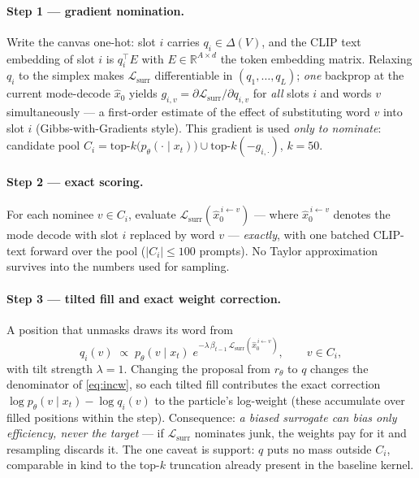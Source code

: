 \documentclass[11pt]{article}
\newcommand{\Ploss}{\mathcal{L}}
\newcommand{\xhat}{\hat{x}_0}
\newcommand{\Lsurr}{\Ploss_{\mathrm{surr}}}
\begin{document}
\paragraph{Step 1 --- gradient nomination.} Write the canvas one-hot:
slot $i$ carries $q_i \in \Delta(V)$, and the CLIP text embedding of slot
$i$ is $q_i^\top E$ with $E \in \mathbb{R}^{A \times d}$ the token
embedding matrix. Relaxing $q_i$ to the simplex makes $\Lsurr$
differentiable in $(q_1,\dots,q_L)$; \emph{one} backprop at the current
mode-decode $\xhat$ yields
$g_{i,v} = \partial \Lsurr / \partial q_{i,v}$ for \emph{all} slots $i$
and words $v$ simultaneously --- a first-order estimate of the effect of
substituting word $v$ into slot $i$ (Gibbs-with-Gradients style). This
gradient is used \emph{only to nominate}: candidate pool
$C_i = \mathrm{top}\text{-}k\big(p_\theta(\cdot \mid x_t)\big) \cup
\mathrm{top}\text{-}k(-g_{i,\cdot})$, $k = 50$.

\paragraph{Step 2 --- exact scoring.} For each nominee $v \in C_i$,
evaluate $\Lsurr(\xhat^{\,i \leftarrow v})$ --- where
$\xhat^{\,i \leftarrow v}$ denotes the mode decode with slot $i$ replaced
by word $v$ --- \emph{exactly}, with one batched
CLIP-text forward over the pool ($|C_i| \le 100$ prompts). No Taylor
approximation survives into the numbers used for sampling.

\paragraph{Step 3 --- tilted fill and exact weight correction.} A position
that unmasks draws its word from
\begin{equation}
\label{eq:tiltq}
q_i(v) \;\propto\;
p_\theta(v \mid x_t)\;
e^{-\lambda\, \beta_{t-1}\, \Lsurr(\xhat^{\,i \leftarrow v})},
\qquad v \in C_i,
\end{equation}
with tilt strength $\lambda{=}1$. Changing the proposal from $r_\theta$ to
$q$ changes the denominator of \eqref{eq:incw}, so each tilted fill
contributes the exact correction
$\log p_\theta(v \mid x_t) - \log q_i(v)$ to the particle's log-weight
(these accumulate over filled positions within the step). Consequence:
\emph{a biased surrogate can bias only efficiency, never the target} ---
if $\Lsurr$ nominates junk, the weights pay for it and resampling discards
it. The one caveat is support: $q$ puts no mass outside $C_i$, comparable
in kind to the top-$k$ truncation already present in the baseline kernel.
\end{document}

